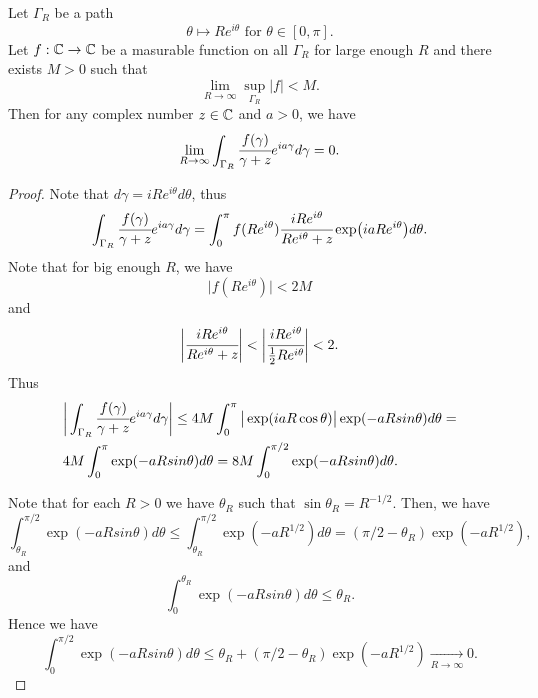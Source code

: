 \documentclass[main.tex]{subfiles}
\begin{document}
\begin{lemma}
\label{cancel-half-circle}
Let $\Gamma_R$ be a path
\begin{equation}
\theta \mapsto Re^{i\theta} \text{ for } \theta\in[0, \pi].
\end{equation}
Let $f:\mathbb{C} \to \mathbb{C}$ be a masurable function on all $\Gamma_R$ for large enough $R$ and there exists $M > 0$ such that
\begin{equation}
\lim_{R\to\infty} \sup_{\Gamma_R} |f| < M.
\end{equation}
Then for any complex number $z\in \mathbb{C}$ and $a > 0$, we have
\begin{equation}
\lim_{R\to \infty} \int_{\Gamma_R} \cfrac{f(\gamma)}{\gamma + z}e^{ia\gamma}d\gamma = 0.
\end{equation} 
\end{lemma}
\begin{proof}
Note that $d\gamma = iRe^{i\theta} d\theta$, thus
\begin{equation}
\int_{\Gamma_R} \cfrac{f(\gamma)}{\gamma + z}e^{ia\gamma}d\gamma =
\int_0^\pi f(Re^{i\theta}) \cfrac{iRe^{i\theta}}{Re^{i\theta} + z} \exp(iaRe^{i\theta})d\theta.
\end{equation}
Note that for big enough $R$, we have
\begin{equation}
\big| f(Re^{i\theta})\big| < 2M
\end{equation}
and 
\begin{equation}
\bigg|  \cfrac{iRe^{i\theta}}{Re^{i\theta} + z} \bigg| < \bigg|  \cfrac{iRe^{i\theta}}{\frac{1}{2}Re^{i\theta}} \bigg| < 2.
\end{equation}
Thus
\begin{align*}
& \bigg| \int_{\Gamma_R} \cfrac{f(\gamma)}{\gamma + z}e^{ia\gamma}d\gamma \bigg| \leq
4M \int_0^\pi \big| \exp(iaR\cos\theta)\big| \exp(-aRsin\theta) d \theta = \\
& 4M \int_0^\pi \exp(-aRsin\theta) d \theta = 8M \int_0^{\pi/2} \exp(-aRsin\theta) d \theta.
\end{align*}

Note that for each $R > 0$ we have $\theta_R$ such that $\sin \theta_R = R^{-1/2}$.
Then, we have
\begin{equation}
\int_{\theta_R}^{\pi/2} \exp(-aRsin\theta) d \theta \leq \int_{\theta_R}^{\pi/2} \exp(-aR^{1/2}) d \theta = (\pi/2 - \theta_R) \exp(-aR^{1/2}),
\end{equation}
and
\begin{equation}
\int_0^{\theta_R} \exp(-aRsin\theta) d \theta \leq \theta_R.
\end{equation}
Hence we have
\begin{equation}
\int_0^{\pi/2} \exp(-aRsin\theta) d \theta \leq \theta_R + (\pi/2 - \theta_R) \exp(-aR^{1/2}) \xrightarrow[R \to \infty]{} 0.
\end{equation} 
\end{proof}
\end{document}
